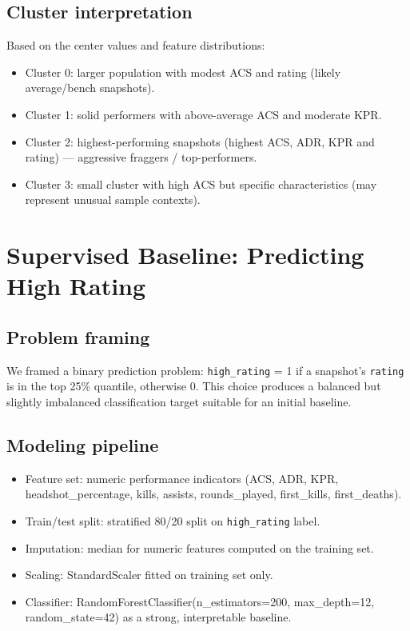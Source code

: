 \documentclass[11pt]{article}
\begin{document}
\subsection{Cluster interpretation}
Based on the center values and feature distributions:
\begin{itemize}
  \item Cluster 0: larger population with modest ACS and rating (likely average/bench snapshots).
  \item Cluster 1: solid performers with above-average ACS and moderate KPR.
  \item Cluster 2: highest-performing snapshots (highest ACS, ADR, KPR and rating) — aggressive fraggers / top-performers.
  \item Cluster 3: small cluster with high ACS but specific characteristics (may represent unusual sample contexts).
\end{itemize}



\section{Supervised Baseline: Predicting High Rating}
\subsection{Problem framing}
We framed a binary prediction problem: \texttt{high\_rating} = 1 if a snapshot's \texttt{rating} is in the top 25\% quantile, otherwise 0. This choice produces a balanced but slightly imbalanced classification target suitable for an initial baseline.

\subsection{Modeling pipeline}
\begin{itemize}
  \item Feature set: numeric performance indicators (ACS, ADR, KPR, headshot\_percentage, kills, assists, rounds\_played, first\_kills, first\_deaths).
  \item Train/test split: stratified 80/20 split on \texttt{high\_rating} label.
  \item Imputation: median for numeric features computed on the training set.
  \item Scaling: StandardScaler fitted on training set only.
  \item Classifier: RandomForestClassifier(n\_estimators=200, max\_depth=12, random\_state=42) as a strong, interpretable baseline.
\end{itemize}
\end{document}

